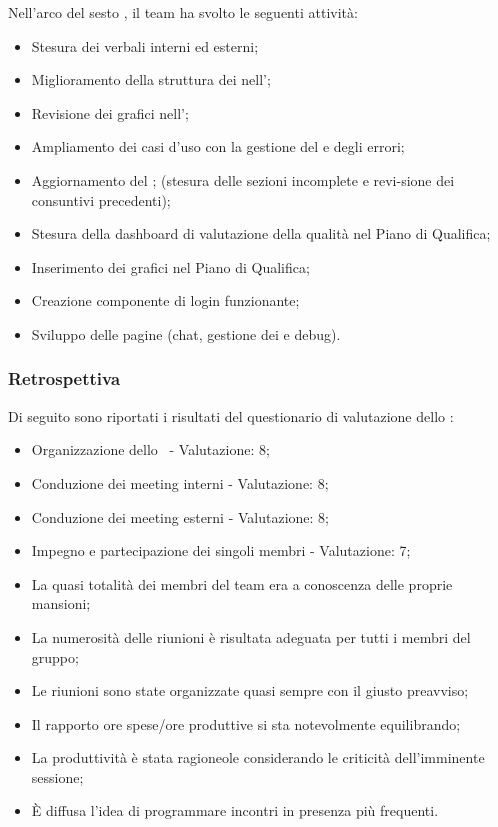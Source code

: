 Nell'arco del sesto , il team ha svolto le seguenti attività:
\begin{itemize}
    \item Stesura dei verbali interni ed esterni;
    \item Miglioramento della struttura dei  nell’\AdR;
    \item Revisione dei grafici nell’\AdR;
    \item Ampliamento dei casi d’uso con la gestione del  e degli errori;
    \item Aggiornamento del \PdP; (stesura delle sezioni incomplete e revi-sione dei consuntivi precedenti);
    \item Stesura della dashboard di valutazione della qualità nel Piano di Qualifica;
    \item Inserimento dei grafici nel Piano di Qualifica;
    \item Creazione componente di login funzionante;
    \item Sviluppo delle pagine  (chat, gestione dei  e debug).
\end{itemize}

\subsubsection{Retrospettiva}

\par Di seguito sono riportati i risultati del questionario di valutazione dello :
\begin{itemize}
  \item Organizzazione dello \ - Valutazione: 8;
  \item Conduzione dei meeting interni - Valutazione: 8;
  \item Conduzione dei meeting esterni - Valutazione: 8;
  \item Impegno e partecipazione dei singoli membri - Valutazione: 7;
  \item La quasi totalità dei membri del team era a conoscenza delle proprie mansioni;
  \item La numerosità delle riunioni è risultata adeguata per tutti i membri del gruppo;
  \item Le riunioni sono state organizzate quasi sempre con il giusto preavviso;
  \item Il rapporto ore spese/ore produttive si sta notevolmente equilibrando;
  \item La produttività è stata ragioneole considerando le criticità dell'imminente sessione;
  \item È diffusa l'idea di programmare incontri in presenza più frequenti.
\end{itemize}

